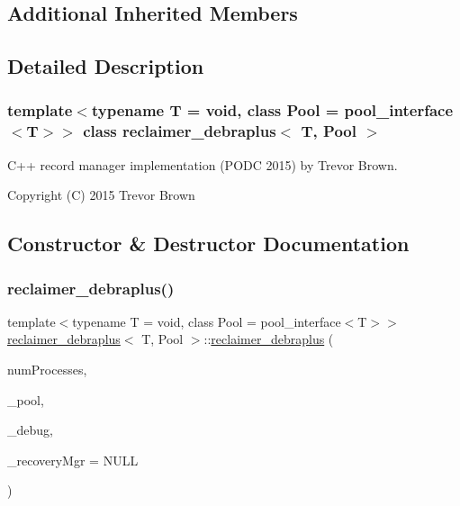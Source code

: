 \subsection*{Additional Inherited Members}


\subsection{Detailed Description}
\subsubsection*{template$<$typename T = void, class Pool = pool\+\_\+interface$<$\+T$>$$>$\newline
class reclaimer\+\_\+debraplus$<$ T, Pool $>$}

C++ record manager implementation (P\+O\+DC 2015) by Trevor Brown.

Copyright (C) 2015 Trevor Brown 

\subsection{Constructor \& Destructor Documentation}
\mbox{\label{classreclaimer__debraplus_aa3aecd07af32bce209348bd4eb10f2ee}} 
\subsubsection{\texorpdfstring{reclaimer\+\_\+debraplus()}{reclaimer\_debraplus()}}
{\footnotesize\ttfamily template$<$typename T  = void, class Pool  = pool\+\_\+interface$<$\+T$>$$>$ \\
\hyperlink{classreclaimer__debraplus}{reclaimer\+\_\+debraplus}$<$ T, Pool $>$\+::\hyperlink{classreclaimer__debraplus}{reclaimer\+\_\+debraplus} (\begin{DoxyParamCaption}\item[{const int}]{num\+Processes,  }\item[{Pool $\ast$}]{\+\_\+pool,  }\item[{\hyperlink{classdebugInfo}{debug\+Info} $\ast$const}]{\+\_\+debug,  }\item[{\hyperlink{classRecoveryMgr}{Recovery\+Mgr}$<$ void $\ast$$>$ $\ast$const}]{\+\_\+recovery\+Mgr = {\ttfamily NULL} }\end{DoxyParamCaption})\hspace{0.3cm}{\ttfamily [inline]}}

